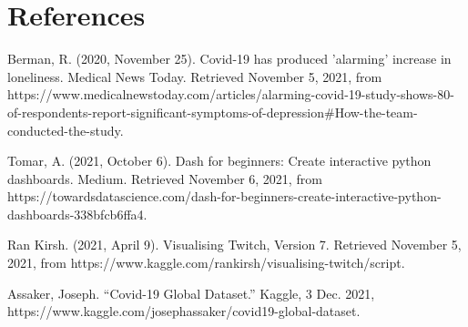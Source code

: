 \documentclass[fontsize=11pt]{article}
\begin{document}
\section*{References}

\begin{hangparas}
Berman, R. (2020, November 25). Covid-19 has produced 'alarming' increase in loneliness. Medical News Today. Retrieved November 5, 2021, from https://www.medicalnewstoday.com/articles/alarming-covid-19-study-shows-80-of-respondents-report-significant-symptoms-of-depression#How-the-team-conducted-the-study.
\end{hangparas} \newline

\begin{hangparas}
Tomar, A. (2021, October 6). Dash for beginners: Create interactive python dashboards. Medium. Retrieved November 6, 2021, from https://towardsdatascience.com/dash-for-beginners-create-interactive-python-dashboards-338bfcb6ffa4.
\end{hangparas}\newline

\begin{hangparas}
Ran Kirsh. (2021, April 9). Visualising Twitch, Version 7. Retrieved November 5, 2021, from https://www.kaggle.com\newline/rankirsh/visualising-twitch/script.
\end{hangparas}

\begin{hangparas}
Assaker, Joseph. “Covid-19 Global Dataset.” Kaggle, 3 Dec. 2021, https://www.kaggle.com/josephassaker/covid19-global-dataset.
\end{hangparas}
\end{document}
